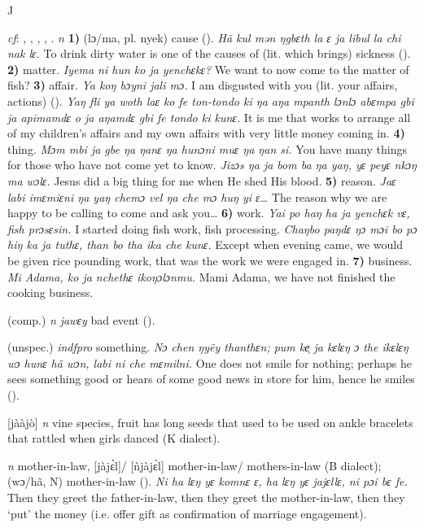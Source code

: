 \begin{letter}{J}

 \textit{cf}: , , , , . \textit{n} \textbf{1)} (lɔ/ma, pl. nyek) cause (\citealt{Pichl1967}). \textit{Hã kul mən ŋgbɛth la ɛ ja libul la chi nak lɛ.} To drink dirty water is one of the causes of (lit. which brings) sickness (\citealt{Pichl1967}). \textbf{2)} matter. \textit{Iyema ni hun ko ja yenchɛkɛ?} We want to now come to the matter of fish? \textbf{3)} affair. \textit{Ya koŋ bɔyni jali mɔ.} I am disgusted with you (lit. your affairs, actions) (\citealt{Pichl1967}). \textit{Yaŋ fli ya woth laɛ ko fe ton-tondo ki ŋa aŋa mpanth lɔnlɔ abɛmpa gbi ja apimamdɛ o ja aŋamdɛ gbi fe tondo ki kunɛ.} It is me that works to arrange all of my children's affairs and my own affairs with very little money coming in. \textbf{4)} thing. \textit{Mɔm mbi ja gbe ŋa ŋanɛ ŋa hunɔni muɛ ŋa ŋan si.} You have many things for those who have not come yet to know. \textit{Jizɔs ŋa ja bom ba ŋa yaŋ, yɛ peyɛ nkɔŋ ma wɔlɛ.} Jesus did a big thing for me when He shed His blood. \textbf{5)} reason. \textit{Jaɛ labi imɛmiɛni ŋa yaŋ chemɔ vel ŋa che mɔ huŋ yi ɛ…} The reason why we are happy to be calling to come and ask you… \textbf{6)} work. \textit{Yai po haŋ ha ja yenchɛk vɛ, fish prɔsɛsin.} I started doing fish work, fish processing. \textit{Chaŋbo paŋdɛ ŋɔ mɔi bo pɔ hiŋ ka ja tuthɛ, than bo tha ika che kunɛ.} Except when evening came, we would be given rice pounding work, that was the work we were engaged in. \textbf{7)} business. \textit{Mi Adama, ko ja nchethɛ ikoŋɔlɔnmu.} Mami Adama, we have not finished the cooking business. 

 (comp.) \textit{n} \textit{jawɛy} bad event (\citealt{Pichl1967}).

 (unspec.) \textit{indfpro} something. \textit{Nɔ chen ŋyẽy thanthɛn; pum ke̹ ja kɛlɛŋ ɔ the ikɛlɛŋ wɔ hunɛ hã wɔn, labi ni che mɛmilni.} One does not smile for nothing; perhaps he sees something good or hears of some good news in store for him, hence he smiles (\citealt{Pichl1967}). 

 [jààjò] \textit{n} vine species, fruit has long seeds that used to be used on ankle bracelets that rattled when girls danced (K dialect). 

 \textit{n} mother-in-law, [jàjɛ̀l]/ [ǹjàjɛ̀l] mother-in-law/ mothers-in-law (B dialect); (wɔ/hã, N) mother-in-law (\citealt{Pichl1967}). \textit{Ni ha lɛŋ yɛ komnɛ ɛ, ha lɛŋ yɛ jajɛllɛ, ni pɔi bɛ fe.} Then they greet the father-in-law, then they greet the mother-in-law, then they ‘put' the money (i.e. offer gift as confirmation of marriage engagement). 


\end{letter}
